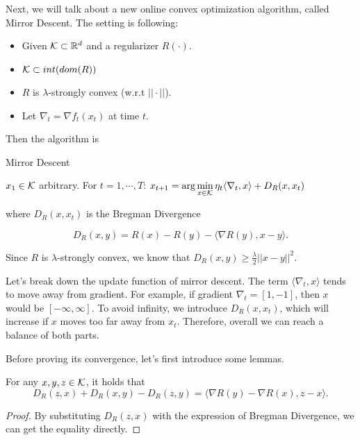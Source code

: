 \documentclass[../main.tex]{subfiles}
\begin{document}
Next, we will talk about a new online convex optimization algorithm, called Mirror Descent. The setting is following:

\begin{itemize}
	\item Given $\mathcal{K} \subset \mathbb{R}^d$ and a regularizer $R(\cdot)$.
	\item $\mathcal{K} \subset int(dom(R))$
	\item $R$ is $\lambda$-strongly convex (w.r.t $||\cdot||$).
	\item Let $\nabla_t = \nabla f_t(x_t)$ at time $t$.
\end{itemize}

Then the algorithm is 

\begin{algorithm}[H]
	\caption{Mirror Descent}
	\begin{algorithmic}
		\STATE $x_1 \in \mathcal{K}$ arbitrary.
		\STATE For $t = 1,\cdots ,T$:
		\bindent 
			\STATE $x_{t+1} = \arg\min\limits_{x\in \mathcal{K}} \eta_t \langle \nabla_t, x \rangle + D_R(x,x_t)$
		\eindent
	\end{algorithmic}
\end{algorithm}

where $D_R(x,x_t)$ is the Bregman Divergence 

\begin{equation*}
	D_R(x,y) = R(x) - R(y) - \langle \nabla R(y), x-y\rangle.
\end{equation*}

Since $R$ is $\lambda$-strongly convex, we know that $D_R(x,y) \geq \frac{\lambda}{2}||x-y||^2$.

Let's break down the update function of mirror descent. The term $\langle \nabla_t, x \rangle$ tends to move away from gradient. For example, if gradient $\nabla_t = [1, -1]$, then $x$ would be $[-\infty, \infty]$. To avoid infinity, we introduce $D_R(x,x_t)$, which will increase if $x$ moves too far away from $x_t$. Therefore, overall we can reach a balance of both parts.

Before proving its convergence, let's first introduce some lemmas.

\begin{lemma}\label{MD_lemma1}
	For any $x, y,z \in \mathcal{K}$, it holds that 
	\begin{equation}
		D_R(z,x) + D_R(x,y) - D_R(z,y) = \langle \nabla R(y) - \nabla R(x), z-x \rangle.
	\end{equation}
\end{lemma}

\begin{proof}
	By substituting $D_R(z,x)$ with the expression of Bregman Divergence, we can get the equality directly.
\end{proof}
\end{document}
